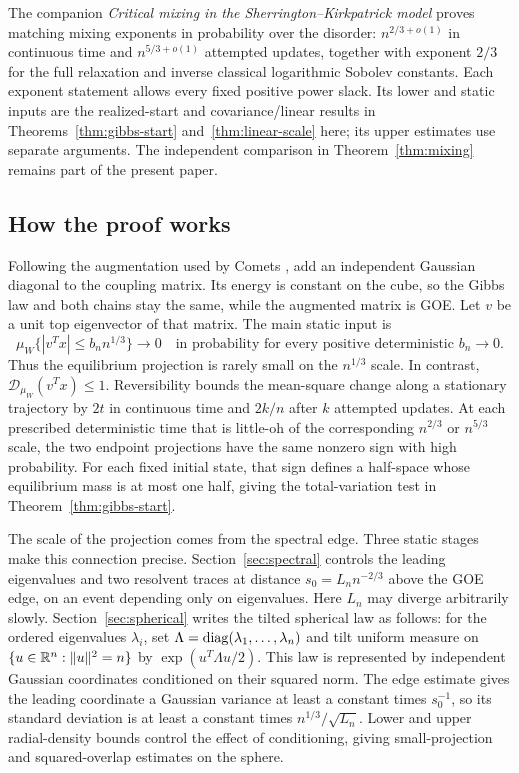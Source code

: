 The companion \emph{Critical mixing in the Sherrington--Kirkpatrick model}
\cite[Theorem~1.1]{criticalmixingcompanion} proves matching mixing exponents
in probability over the disorder: $n^{2/3+o(1)}$ in continuous time and
$n^{5/3+o(1)}$ attempted updates, together with exponent $2/3$ for the
full relaxation and inverse classical logarithmic Sobolev constants.
Each exponent statement allows every fixed positive power slack. Its
lower and static inputs are the realized-start and covariance/linear
results in Theorems~\ref{thm:gibbs-start} and~\ref{thm:linear-scale} here;
its upper estimates use separate arguments. The independent comparison
in Theorem~\ref{thm:mixing} remains part of the present paper.

\subsection{How the proof works}
Following the augmentation used by Comets \cite[Equation~(1.1)]{comets1996},
add an independent Gaussian diagonal to the coupling matrix. Its energy
is constant on the cube, so the Gibbs law and both chains stay the same,
while the augmented matrix is GOE. Let $v$ be a unit top eigenvector of
that matrix. The main static input is
\[
 \mu_W\{|v^Tx|\le b_n n^{1/3}\}\longrightarrow0
 \quad\text{in probability for every positive deterministic }b_n\to0.
\]
Thus the equilibrium projection is rarely small on the $n^{1/3}$ scale.
In contrast, $\mathcal D_{\mu_W}(v^Tx)\le1$. Reversibility bounds the
mean-square change along a stationary trajectory by $2t$ in continuous
time and $2k/n$ after $k$ attempted updates. At each prescribed
deterministic time that is little-oh of the corresponding $n^{2/3}$ or
$n^{5/3}$ scale, the two endpoint projections have the same nonzero sign
with high probability. For each fixed initial state, that sign defines a
half-space whose equilibrium mass is at most one half, giving the
total-variation test in Theorem~\ref{thm:gibbs-start}.

The scale of the projection comes from the spectral edge. Three static
stages make this connection precise.
Section~\ref{sec:spectral} controls the leading eigenvalues and two
resolvent traces at distance $s_0=L_n n^{-2/3}$ above the GOE edge, on
an event depending only on eigenvalues. Here $L_n$ may diverge arbitrarily
slowly. Section~\ref{sec:spherical} writes the tilted spherical law as
follows: for the ordered eigenvalues $\lambda_i$, set
$\Lambda=\operatorname{diag}(\lambda_1,\ldots,\lambda_n)$ and tilt uniform measure on
$\{u\in\mathbb R^n:\|u\|^2=n\}$ by $\exp(u^T\Lambda u/2)$. This law is represented by
independent Gaussian coordinates conditioned on their squared norm.
The edge estimate gives the leading coordinate a Gaussian variance at
least a constant times $s_0^{-1}$, so its standard deviation is at least
a constant times $n^{1/3}/\sqrt{L_n}$. Lower and upper radial-density
bounds control the effect of conditioning, giving small-projection and
squared-overlap estimates on the sphere.

